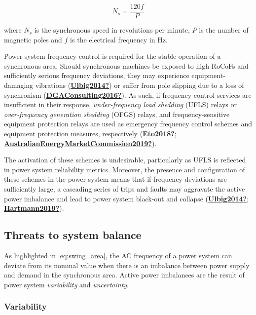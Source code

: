 \documentclass[12pt,a4paper,]{report}
\begin{document}
\[N_s = \frac{120f}{P}
        \label{eq:synch_speed}\]

where \(N_s\) is the synchronous speed in revolutions per minute, \(P\)
is the number of magnetic poles and \(f\) is the electrical frequency in
Hz.

Power system frequency control is required for the stable operation of a
synchronous area. Should synchronous machines be exposed to high RoCoFs
and sufficiently serious frequency deviations, they may experience
equipment-damaging vibrations
(\protect\hyperlink{ref-Ulbig2014}{\textbf{Ulbig2014?}}) or suffer from
pole slipping due to a loss of synchronism
(\protect\hyperlink{ref-DGAConsulting2016}{\textbf{DGAConsulting2016?}}).
As such, if frequency control services are insufficient in their
response, \emph{under-frequency load shedding} (UFLS) relays or
\emph{over-frequency generation shedding} (OFGS) relays, and
frequency-sensitive equipment protection relays are used as emergency
frequency control schemes and equipment protection measures,
respectively (\protect\hyperlink{ref-Eto2018}{\textbf{Eto2018?}};
\protect\hyperlink{ref-AustralianEnergyMarketCommission2019}{\textbf{AustralianEnergyMarketCommission2019?}}).

The activation of these schemes is undesirable, particularly as UFLS is
reflected in power system reliability metrics. Moreover, the presence
and configuration of these schemes in the power system means that if
frequency deviations are sufficiently large, a cascading series of trips
and faults may aggravate the active power imbalance and lead to power
system black-out and collapse
(\protect\hyperlink{ref-Ulbig2014}{\textbf{Ulbig2014?}};
\protect\hyperlink{ref-Hartmann2019}{\textbf{Hartmann2019?}}).

\hypertarget{threats-to-system-balance}{%
\subsection{Threats to system balance}\label{threats-to-system-balance}}

As highlighted in
\protect\hyperlink{eq:swing_area}{{[}eq:swing\_area{]}}, the AC
frequency of a power system can deviate from its nominal value when
there is an imbalance between power supply and demand in the synchronous
area. Active power imbalances are the result of power system
\emph{variability} and \emph{uncertainty}.

\hypertarget{variability}{%
\subsubsection{Variability}\label{variability}}
\end{document}
